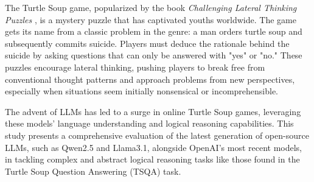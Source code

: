 \documentclass[conference]{IEEEtran}
\begin{document}
The Turtle Soup game, popularized by the book \textit{Challenging Lateral Thinking Puzzles} \cite{sloane1993challenging}, is a mystery puzzle that has captivated youths worldwide. The game gets its name from a classic problem in the genre: a man orders turtle soup and subsequently commits suicide. Players must deduce the rationale behind the suicide by asking questions that can only be answered with "yes" or "no." These puzzles encourage lateral thinking, pushing players to break free from conventional thought patterns and approach problems from new perspectives, especially when situations seem initially nonsensical or incomprehensible. 

The advent of LLMs has led to a surge in online Turtle Soup games, leveraging these models' language understanding and logical reasoning capabilities. %
This study presents a comprehensive evaluation of the latest generation of open-source LLMs, such as Qwen2.5 and Llama3.1, alongside OpenAI's most recent models, in tackling complex and abstract logical reasoning tasks like those found in the Turtle Soup Question Answering (TSQA) task. %
\end{document}
